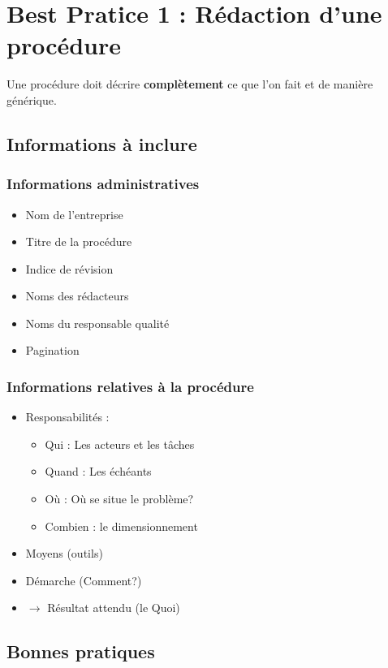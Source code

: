 \section{Best Pratice 1 : Rédaction d'une procédure}

Une procédure doit décrire \textbf{complètement} ce que l'on fait et de manière générique.

\subsection{Informations à inclure}
  \subsubsection{Informations administratives}
    \begin{itemize}
      \item Nom de l'entreprise
      \item Titre de la procédure
      \item Indice de révision
      \item Noms des rédacteurs
      \item Noms du responsable qualité
      \item Pagination
    \end{itemize}
  \subsubsection{Informations relatives à la procédure}
    \begin{itemize}             
      \item Responsabilités : 
        \begin{itemize}             
          \item Qui : Les acteurs et les tâches
          \item Quand : Les échéants
          \item Où : Où se situe le problème?
          \item Combien : le dimensionnement\\
        \end{itemize}
      \item Moyens (outils)
      \item Démarche (Comment?)
      \item $\rightarrow$ Résultat attendu (le Quoi)
     \end{itemize}
     
\subsection{Bonnes pratiques}